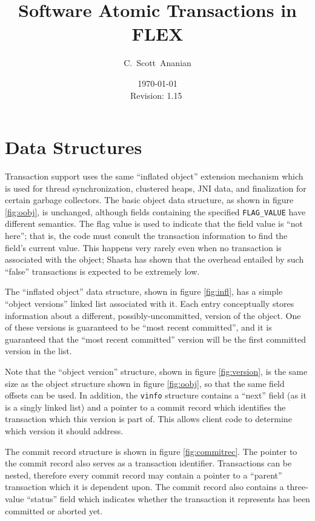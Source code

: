 \documentclass[11pt,notitlepage]{article}
\author{C.~Scott~Ananian}
\title{Software Atomic Transactions in FLEX}
\date{\today \\ $ $Revision: 1.15 $ $}
\begin{document}

\maketitle
\section{Data Structures}

Transaction support uses the same ``inflated object'' extension
mechanism which is used for thread synchronization, clustered heaps,
JNI data, and finalization for certain garbage collectors.
The basic object data structure, as shown in figure \ref{fig:oobj}, is
unchanged, although fields containing the specified
\texttt{FLAG\_VALUE} have different semantics.  The flag value is used
to indicate that the field value is ``not here''; that is, the code
must consult the transaction information to find the field's current
value.  This happens very rarely even when no transaction is
associated with the object; Shasta \cite{scales96:shasta} has shown that the
overhead entailed by such ``false'' transactions is expected to be
extremely low.

The ``inflated object'' data structure, shown in figure
\ref{fig:infl}, has a simple ``object versions'' linked list associated with
it.  Each entry conceptually stores information about a different,
possibly-uncommitted, version of the object.  One of these versions is
guaranteed to be ``most recent committed'', and it is guaranteed that
the ``most recent committed'' version will be the first committed
version in the list.

Note that the ``object version'' structure, shown in figure
\ref{fig:version}, is the same size as the object structure shown in
figure \ref{fig:oobj}, so that the same field offsets can be used.
In addition, the \texttt{vinfo} structure contains a ``next'' field
(as it is a singly linked list) and a pointer to a commit record which
identifies the transaction which this version is part of.  This allows
client code to determine which version it should address.

The commit record structure is shown in figure \ref{fig:commitrec}.
The pointer to the commit record also serves as a transaction
identifier.  Transactions can be nested, therefore every commit record
may contain a pointer to a ``parent'' transaction which it is
dependent upon.  The commit record also contains a three-value
``status'' field which indicates whether the transaction it represents
has been committed or aborted yet.
\end{document}
